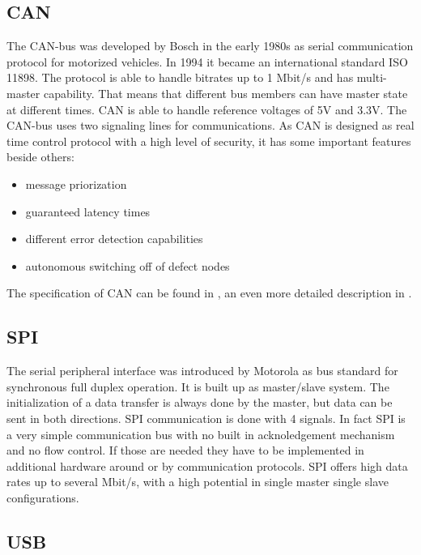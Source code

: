 \subsection{CAN}
The CAN-bus was developed by Bosch in the early 1980s as serial communication protocol for motorized vehicles. In 1994 it became an international standard ISO 11898. The protocol is able to handle bitrates up to 1 Mbit/s and has multi-master capability. That means that different bus members can have master state at different times. CAN is able to handle reference voltages of 5V and 3.3V.\cite{Corrig2008} The CAN-bus uses two signaling lines for communications. As CAN is designed as real time control protocol with a high level of security, it has some important features beside others\cite{boschcan91}:
\begin{itemize}
\item message priorization
\item guaranteed latency times
\item different error detection capabilities
\item autonomous switching off of defect nodes
\end{itemize}
The specification of CAN can be found in \cite{boschcan91}, an even more detailed description in \cite{nxpcan98}.
\subsection {SPI}
The serial peripheral interface was introduced by Motorola as bus standard for synchronous full duplex operation. It is built up as master/slave system. The initialization of a data transfer is always done by the master, but data can be sent in both directions. SPI communication is done with 4 signals. In fact SPI is a very simple communication bus with no built in acknoledgement mechanism and no flow control. If those are needed they have to be implemented in additional hardware around or by communication protocols. SPI offers high data rates up to several Mbit/s, with a high potential in single master single slave configurations.\cite{SPI02}
\subsection{USB}
